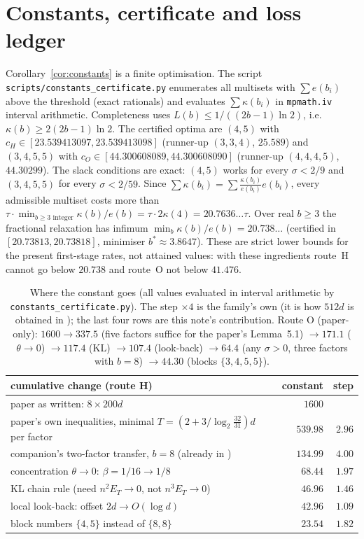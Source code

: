 \documentclass[11pt]{amsart}
\theoremstyle{remark}
\begin{document}
\section{Constants, certificate and loss ledger}\label{sec:constants}
Corollary~\ref{cor:constants} is a finite optimisation. The script
\texttt{scripts/constants\_certificate.py} enumerates all multisets with $\sum e(b_i)$ above the threshold
(exact rationals) and evaluates $\sum\kappa(b_i)$ in \texttt{mpmath.iv} interval arithmetic. Completeness
uses $L(b)\le1/((2b-1)\ln2)$, i.e.\ $\kappa(b)\ge2(2b-1)\ln2$. The certified optima are
$(4,5)$ with $c_H\in[23.539413097,23.539413098]$ (runner-up $(3,3,4)$, $25.589$) and $(3,4,5,5)$ with
$c_O\in[44.300608089,44.300608090]$ (runner-up $(4,4,4,5)$, $44.30299$). The slack conditions are exact:
$(4,5)$ works for every $\sigma<2/9$ and $(3,4,5,5)$ for every $\sigma<2/59$. Since
$\sum\kappa(b_i)=\sum\frac{\kappa(b_i)}{e(b_i)}e(b_i)$, every admissible multiset costs more than
$\tau\cdot\min_{b\ge3\text{ integer}}\kappa(b)/e(b)=\tau\cdot2\kappa(4)=20.7636\ldots\tau$. Over real
$b\ge3$ the fractional relaxation has infimum $\min_b\kappa(b)/e(b)=20.738\ldots$ (certified in
$[20.73813,20.73818]$, minimiser $b^*\approx3.8647$). These are strict lower bounds for the present
first-stage rates, not attained values: with these ingredients route~H cannot go below $20.738$ and
route~O not below $41.476$.

\begin{table}[h]\small
\begin{tabular}{lrr}
\toprule
cumulative change (route H) & constant & step\\
\midrule
paper as written: $8\times200d$ & $1600$ & \\
paper's own inequalities, minimal $T=(2+3/\log_2\frac{32}{31})d$ per factor & $539.98$ & $2.96$\\
companion's two-factor transfer, $b=8$ (already in \cite[Cor.~11.4]{oai-frames}) & $134.99$ & $4.00$\\
concentration $\theta\to0$: $\beta=1/16\to1/8$ & $68.44$ & $1.97$\\
KL chain rule (need $n^2E_T\to0$, not $n^3E_T\to0$) & $46.96$ & $1.46$\\
local look-back: offset $2d\to O(\log d)$ & $42.96$ & $1.09$\\
block numbers $\{4,5\}$ instead of $\{8,8\}$ & $23.54$ & $1.82$\\
\bottomrule
\end{tabular}
\caption{Where the constant goes (all values evaluated in interval arithmetic by \texttt{constants\_certificate.py}).
The step $\times4$ is the family's own (it is how $512d$ is obtained in \cite{oai-frames}); the last four
rows are this note's contribution. Route O (paper-only):
$1600\to337.5$ (five factors suffice for the paper's Lemma~5.1) $\to171.1$ ($\theta\to0$) $\to117.4$ (KL)
$\to107.4$ (look-back) $\to64.4$ (any $\sigma>0$, three factors with $b=8$) $\to44.30$ (blocks $\{3,4,5,5\}$).}\label{tab:ledger}
\end{table}
\end{document}
